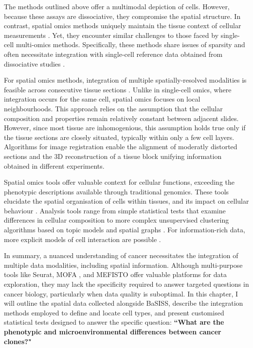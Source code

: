 The methods outlined above offer a multimodal depiction of cells. However, because these assays are dissociative, they compromise the spatial structure. In contrast, spatial omics methods uniquely maintain the tissue context of cellular measurements . Yet, they encounter similar challenges to those faced by single-cell multi-omics methods. Specifically, these methods share issues of sparsity and often necessitate integration with single-cell reference data obtained from dissociative studies . 

For spatial omics methods, integration of multiple spatially-resolved modalities is feasible across consecutive tissue sections . Unlike in single-cell omics, where integration occurs for the same cell, spatial omics focuses on local neighbourhoods. This approach relies on the assumption that the cellular composition and properties remain relatively constant between adjacent slides. However, since most tissue are inhomogenious, this assumption holds true only if the tissue sections are closely situated, typically within only a few cell layers. Algorithms for image registration enable the alignment of moderatly distorted sections and the 3D reconstruction of a tissue block \parencite{Kiemen2020-dc} unifying information obtained in different experiments. 

Spatial omics tools offer valuable context for cellular functions, exceeding the phenotypic descriptions available through traditional genomics. These tools elucidate the spatial organisation of cells within tissues, and its impact on cellular behaviour . Analysis tools range from simple statistical tests that examine differences in cellular composition to more complex unsupervised clustering algorithms based on topic models \parencite{Nirmal2022-sq} and spatial graphs \parencite{Danenberg2022-zb}. For information-rich data, more explicit models of cell interaction are possible \parencite{Fischer2023-go}.

In summary, a nuanced understanding of cancer necessitates the integration of multiple data modalities, including spatial information. Although multi-purpose tools like Seurat, MOFA \parencite{Argelaguet2018-oz}, and MEFISTO \parencite{Velten2022-gc} offer valuable platforms for data exploration, they may lack the specificity required to answer targeted questions in cancer biology, particularly when data quality is suboptimal. In this chapter, I will outline the spatial data collected alongside \ac{BaSISS}, describe the integration methods employed to define and locate cell types, and present customised statistical tests designed to answer the specific question: \textbf{``What are the phenotypic and microenvironmental differences between cancer clones?"}

